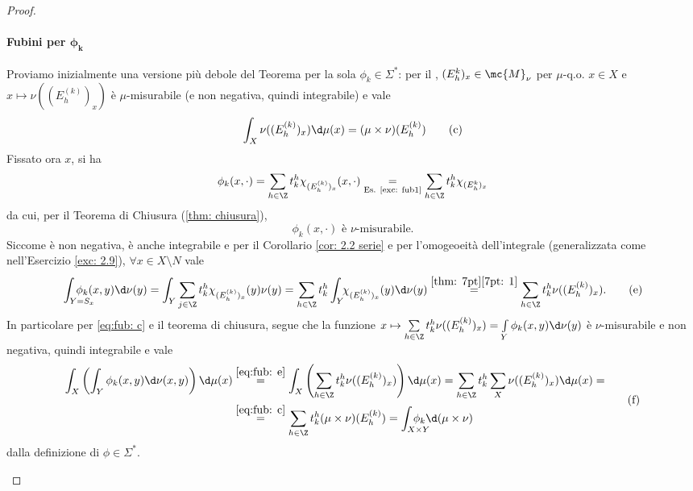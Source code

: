 \begin{proof}
\begin{itemize}
        \paragraph{Fubini per $\boldsymbol\phi_{\boldsymbol k}$} Proviamo inizialmente una versione più debole del Teorema per la sola $\phi_k\in \Sigma^*$: per il \lemmone, $(E_h^{k})_x\in \mc{M}_{\nu}$ per $\mu$-q.o. $x\in X$ e $x\mapsto \nu((E_h^{(k)})_x)$ è $\mu$-misurabile (e non negativa, quindi integrabile) e vale 
        \[\int_X\nu ((E_h^{(k)})_x)\d\mu(x)=(\mu\times\nu)(E_h^{(k)})\tag{c}\label{eq:fub: c}\]
        Fissato ora $x$, si ha 
        \[\phi_k(x,\cdot) = \sum_{h\in \Z}t^h_k\chi_{(E_h^{(k)})_x}(x,\cdot) \underset{\text{Es. \ref{exc: fub1}}}{=} \sum_{h\in \Z}t^h_k\chi_{(E_h^{k})_x}\]
        da cui, per il Teorema di Chiusura (\ref{thm: chiusura}), \[\phi_k(x,\cdot) \text{ è $\nu$-misurabile.}\tag{d}\label{eq:fub: d}\] Siccome è non negativa, è anche integrabile e per il Corollario \ref{cor: 2.2 serie} e per l'omogeoeità dell'integrale (generalizzata come nell'Esercizio \ref{exc: 2.9}), $\forall x\in X\setminus N$ vale 
        \[\int_{Y=S_x}\!\!\!\!\!\!\!\!\!\!\!\phi_k(x,y)\d\nu(y) = \int_Y\sum_{j\in \Z}t_k^h\chi_{(E_h^{(k)})_x}(y)\nu(y) = \sum_{h\in \Z}t_k^h\int_Y\!\!\chi_{(E_h^{(k)})_x}(y)\d\nu(y) \overset{\ref{thm: 7pt}\ref{7pt: 1}}{=} \sum_{h\in\Z}t_k^h\nu((E_h^{(k)})_x).\label{eq:fub: e}\tag{e}\]
        In particolare per \eqref{eq:fub: c} e il teorema di chiusura, segue che la funzione $x\mapsto \sum\limits_{h\in \Z}t_k^h\nu((E_h^{(k)})_x)=\int\limits_{Y}\phi_k(x,y)\d\nu(y)$ è $\nu$-misurabile e non negativa, quindi integrabile e vale 
        \[\begin{aligned}\int_X\left(\int_Y\phi_k(x,y)\d\nu(x,y)\right)\d\mu(x)&\overset{\eqref{eq:fub: e}}{=}\int_X\left(\sum_{h\in \Z}t_k^h\nu((E_h^{(k)})_x)\right)\d\mu(x) = \sum_{h\in \Z}t_k^{h}\sum_X\nu((E_h^{(k)})_x)\d\mu(x) = \\ & \overset{\eqref{eq:fub: c}}{=} \sum_{h\in \Z}t_k^{h}(\mu\times \nu)(E_h^{(k)}) = \int_{X\times Y}\!\!\!\!\!\!\!\!\!\!\phi_k\d(\mu\times \nu) \end{aligned}\tag{f}\label{eq:fub: f}\]
        dalla definizione di $\phi\in \Sigma^*$.

\end{itemize}
\end{proof}
